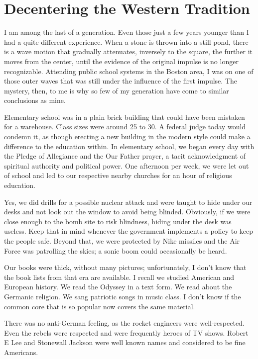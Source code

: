 \section{Decentering the Western Tradition}

I am among the last of a generation. Even those just a few years younger than I had a quite different experience. When a stone is thrown into a still pond, there is a wave motion that gradually attenuates, inversely to the square, the further it moves from the center, until the evidence of the original impulse is no longer recognizable. Attending public school systems in the Boston area, I was on one of those outer waves that was still under the influence of the first impulse. The mystery, then, to me is why so few of my generation have come to similar conclusions as mine.

Elementary school was in a plain brick building that could have been mistaken for a warehouse. Class sizes were around 25 to 30. A federal judge today would condemn it, as though erecting a new building in the modern style could make a difference to the education within. In elementary school, we began every day with the Pledge of Allegiance and the Our Father prayer, a tacit acknowledgment of spiritual authority and political power. One afternoon per week, we were let out of school and led to our respective nearby churches for an hour of religious education.

Yes, we did drills for a possible nuclear attack and were taught to hide under our desks and not look out the window to avoid being blinded. Obviously, if we were close enough to the bomb site to risk blindness, hiding under the desk was useless. Keep that in mind whenever the government implements a policy to keep the people safe. Beyond that, we were protected by Nike missiles and the Air Force was patrolling the skies; a sonic boom could occasionally be heard.

Our books were thick, without many pictures; unfortunately, I don't know that the book lists from that era are available. I recall we studied American and European history. We read the Odyssey in a text form. We read about the Germanic religion. We sang patriotic songs in music class. I don't know if the common core that is so popular now covers the same material.

There was no anti-German feeling, as the rocket engineers were well-respected. Even the rebels were respected and were frequently heroes of TV shows. Robert E Lee and Stonewall Jackson were well known names and considered to be fine Americans.

